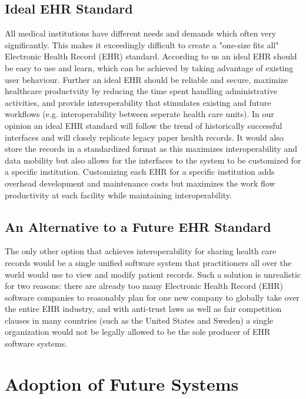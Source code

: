 \documentclass[14pt]{article}
\begin{document}
\subsection{Ideal EHR Standard}
All medical institutions have different needs and demands which often very significantly. This makes it exceedingly difficult to create a "one-size fits all" Electronic Health Record (EHR) standard. According to us an ideal EHR should be easy to use and learn, which can be achieved by taking advantage of existing user behaviour. Further an ideal EHR should be reliable and secure, maximize healthcare productviity by reducing the time spent handling administrative activities, and provide interoperability that stimulates existing and future workflows (e.g. interoperability between seperate health care units). In our opinion an ideal EHR standard will follow the trend of historically successful interfaces and will closely replicate legacy paper health records. It would also store the records in a standardized format as this maximizes interoperability and data mobility but also allows for the interfaces to the system to be customized for a specific institution. Customizing each EHR for a specific institution adds overhead development and maintenance costs but maximizes the work flow productivity at each facility while maintaining interoperability. 

\subsection{An Alternative to a Future EHR Standard}
\label{sec:TechnicalStandardsAlternative}
The only other option that achieves interoperability for sharing health care records would be a single unified software system that practitioners all over the world would use to view and modify patient records. Such a solution is unrealistic for two reasons: there are already too many Electronic Health Record (EHR) software companies to reasonably plan for one new company to globally take over the entire EHR industry, and with anti-trust laws as well as fair competition clauses in many countries (such as the United States and Sweden) a single organization would not be legally allowed to be the sole producer of EHR software systems.

\newpage

\section{Adoption of Future Systems}
\label{sec:Future}
\end{document}
